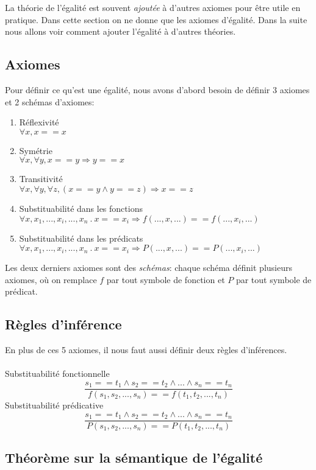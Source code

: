 {La théorie de l'égalité est souvent {\em ajoutée} à d'autres axiomes pour être utile en pratique.
Dans cette section on ne donne que les axiomes d'égalité.  Dans la suite nous allons voir comment
ajouter l'égalité à d'autres théories.

\subsection{Axiomes} 
Pour définir ce qu'est une égalité, nous avons d'abord besoin de définir 3 axiomes et 2 schémas d'axiomes:
\begin{enumerate}
\item Réflexivité \\$\forall x, x==x$
\item Symétrie \\$\forall x, \forall y, x==y \Rightarrow y==x$
\item Transitivité \\$\forall x, \forall y, \forall z, (x==y \land y==z) \Rightarrow x==z$
\item Substituabilité dans les fonctions\\$\forall x, x_{1}, ..., x_i, ..., x_{n}\ .\ x==x_i \Rightarrow f(..., x, ...) == f(..., x_i, ...)$
\item Substituabilité dans les prédicats\\$\forall x, x_{1}, ..., x_i, ..., x_{n}\ .\ x==x_i \Rightarrow P(..., x, ...) == P(..., x_i, ...)$ 
\end{enumerate}
Les deux derniers axiomes sont des {\em schémas}: chaque schéma définit plusieurs axiomes, où on remplace $f$ par tout symbole de fonction et $P$ par tout symbole de prédicat.

\subsection{Règles d'inférence}
En plus de ces 5 axiomes, il nous faut aussi définir deux règles d'inférences.\\ \\
Substituabilité fonctionnelle 
	$$ \frac{s_{1}==t_{1} \land s_{2}==t_{2} \land ... \land s_{n}==t_{n}}{f(s_{1},s_{2},...,s_{n}) == f(t_{1},t_{2},...,t_{n})}$$ 
	Substituabilité prédicative 
	$$ \frac{s_{1}==t_{1} \land s_{2}==t_{2} \land ... \land s_{n}==t_{n}}{P(s_{1},s_{2},...,s_{n}) == P(t_{1},t_{2},...,t_{n})}$$ 

\subsection{Théorème sur la sémantique de l'égalité}

}
